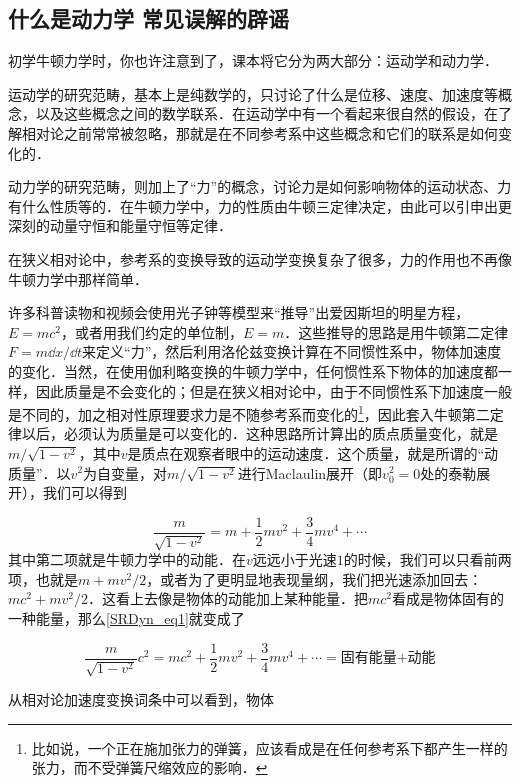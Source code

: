 

\subsection{什么是动力学 常见误解的辟谣}
初学牛顿力学时，你也许注意到了，课本将它分为两大部分：运动学和动力学．

运动学的研究范畴，基本上是纯数学的，只讨论了什么是位移、速度、加速度等概念，以及这些概念之间的数学联系．在运动学中有一个看起来很自然的假设，在了解相对论之前常常被忽略，那就是在不同参考系中这些概念和它们的联系是如何变化的．

动力学的研究范畴，则加上了“力”的概念，讨论力是如何影响物体的运动状态、力有什么性质等的．在牛顿力学中，力的性质由牛顿三定律决定，由此可以引申出更深刻的动量守恒和能量守恒等定律．

在狭义相对论中，参考系的变换导致的运动学变换复杂了很多，力的作用也不再像牛顿力学中那样简单．

许多科普读物和视频会使用光子钟等模型来“推导”出爱因斯坦的明星方程，$E=mc^2$，或者用我们约定的单位制，$E=m$．这些推导的思路是用牛顿第二定律$F=m\dd x/\dd t$来定义“力”，然后利用洛伦兹变换计算在不同惯性系中，物体加速度的变化．当然，在使用伽利略变换的牛顿力学中，任何惯性系下物体的加速度都一样，因此质量是不会变化的；但是在狭义相对论中，由于不同惯性系下加速度一般是不同的，加之相对性原理要求力是不随参考系而变化的\footnote{比如说，一个正在施加张力的弹簧，应该看成是在任何参考系下都产生一样的张力，而不受弹簧尺缩效应的影响．}，因此套入牛顿第二定律以后，必须认为质量是可以变化的．这种思路所计算出的质点质量变化，就是$m/\sqrt{1-v^2}$，其中$v$是质点在观察者眼中的运动速度．这个质量，就是所谓的“动质量”．以$v^2$为自变量，对$m/\sqrt{1-v^2}$进行Maclaulin展开（即$v_0^2=0$处的泰勒展开），我们可以得到

\begin{equation}\label{SRDyn_eq1}
\frac{m}{\sqrt{1-v^2}}=m+\frac{1}{2}mv^2+\frac{3}{4}mv^4+\cdots
\end{equation}
其中第二项就是牛顿力学中的动能．在$v$远远小于光速$1$的时候，我们可以只看前两项，也就是$m+mv^2/2$，或者为了更明显地表现量纲，我们把光速添加回去：$mc^2+mv^2/2$．这看上去像是物体的动能加上某种能量．把$mc^2$看成是物体固有的一种能量，那么\autoref{SRDyn_eq1}就变成了

\begin{equation}
\frac{m}{\sqrt{1-v^2}}c^2=mc^2+\frac{1}{2}mv^2+\frac{3}{4}mv^4+\cdots=\text{固有能量+动能}
\end{equation}


从相对论加速度变换词条中可以看到，物体